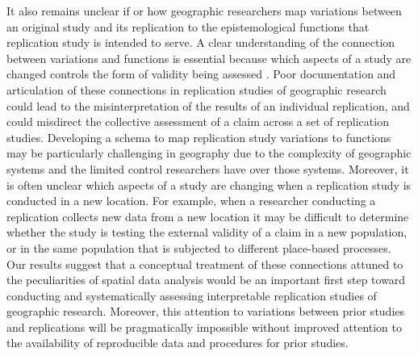 \documentclass[]{interact}
\theoremstyle{plain}%
\theoremstyle{definition}
\theoremstyle{remark}
\begin{document}
It also remains unclear if or how geographic researchers map variations between an original study and its replication to the epistemological functions that replication study is intended to serve.
A clear understanding of the connection between variations and functions is essential because which aspects of a study are changed controls the form of validity being assessed \citep{gomez2010replications, radder2003, schmidt2009}.
Poor documentation and articulation of these connections in replication studies of geographic research could lead to the misinterpretation of the results of an individual replication, and could misdirect the collective assessment of a claim across a set of replication studies.
Developing a schema to map replication study variations to functions may be particularly challenging in geography due to the complexity of geographic systems and the limited control researchers have over those systems. 
Moreover, it is often unclear which aspects of a study are changing when a replication study is conducted in a new location. 
For example, when a researcher conducting a replication collects new data from a new location it may be difficult to determine whether the study is testing the external validity of a claim in a new population, or in the same population that is subjected to different place-based processes.
Our results suggest that a conceptual treatment of these connections attuned to the peculiarities of spatial data analysis would be an important first step toward conducting and systematically assessing interpretable replication studies of geographic research. 
Moreover, this attention to variations between prior studies and replications will be pragmatically impossible without improved attention to the availability of reproducible data and procedures for prior studies.
\end{document}
